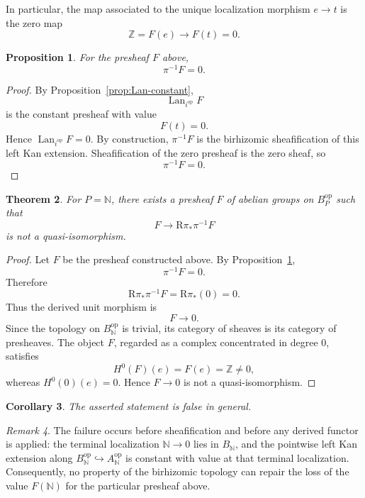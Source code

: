 \documentclass[11pt]{article}
\newtheorem{theorem}{Theorem}[section]
\newtheorem{proposition}[theorem]{Proposition}
\newtheorem{corollary}[theorem]{Corollary}
\theoremstyle{definition}
\theoremstyle{remark}
\newtheorem{remark}[theorem]{Remark}
\newcommand{\op}{{\mathrm{op}}}
\newcommand{\Lan}{\operatorname{Lan}}
\newcommand{\N}{\mathbb N}
\newcommand{\Z}{\mathbb Z}
\begin{document}
In particular, the map associated to the unique localization morphism
\(e\to t\) is the zero map
\[
\Z=F(e)\longrightarrow F(t)=0.
\]

\begin{proposition}\label{prop:pi-inverse-zero}
For the presheaf \(F\) above,
\[
\pi^{-1}F=0.
\]
\end{proposition}

\begin{proof}
By Proposition~\ref{prop:Lan-constant},
\[
\Lan_{i^\op}F
\]
is the constant presheaf with value
\[
F(t)=0.
\]
Hence \(\Lan_{i^\op}F=0\).  By construction, \(\pi^{-1}F\) is the
birhizomic sheafification of this left Kan extension.  Sheafification
of the zero presheaf is the zero sheaf, so
\[
\pi^{-1}F=0.
\]
\end{proof}

\begin{theorem}
For \(P=\N\), there exists a presheaf \(F\) of abelian groups on
\(B_P^{\op}\) such that
\[
F\longrightarrow\mathrm R\pi_{\ast}\pi^{-1}F
\]
is not a quasi-isomorphism.
\end{theorem}

\begin{proof}
Let \(F\) be the presheaf constructed above.  By
Proposition~\ref{prop:pi-inverse-zero},
\[
\pi^{-1}F=0.
\]
Therefore
\[
\mathrm R\pi_{\ast}\pi^{-1}F
=
\mathrm R\pi_{\ast}(0)
=
0.
\]
Thus the derived unit morphism is
\[
F\longrightarrow 0.
\]
Since the topology on \(B_{\N}^{\op}\) is trivial, its category of
sheaves is its category of presheaves.  The object \(F\), regarded as
a complex concentrated in degree \(0\), satisfies
\[
H^0(F)(e)=F(e)=\Z\neq0,
\]
whereas \(H^0(0)(e)=0\).  Hence \(F\to0\) is not a
quasi-isomorphism.
\end{proof}

\begin{corollary}
The asserted statement is false in general.
\end{corollary}

\begin{remark}
The failure occurs before sheafification and before any derived
functor is applied: the terminal localization \(\N\to0\) lies in
\(B_{\N}\), and the pointwise left Kan extension along
\(B_{\N}^{\op}\hookrightarrow A_{\N}^{\op}\) is constant with value at
that terminal localization.  Consequently, no property of the
birhizomic topology can repair the loss of the value \(F(\N)\) for the
particular presheaf above.
\end{remark}
\end{document}
